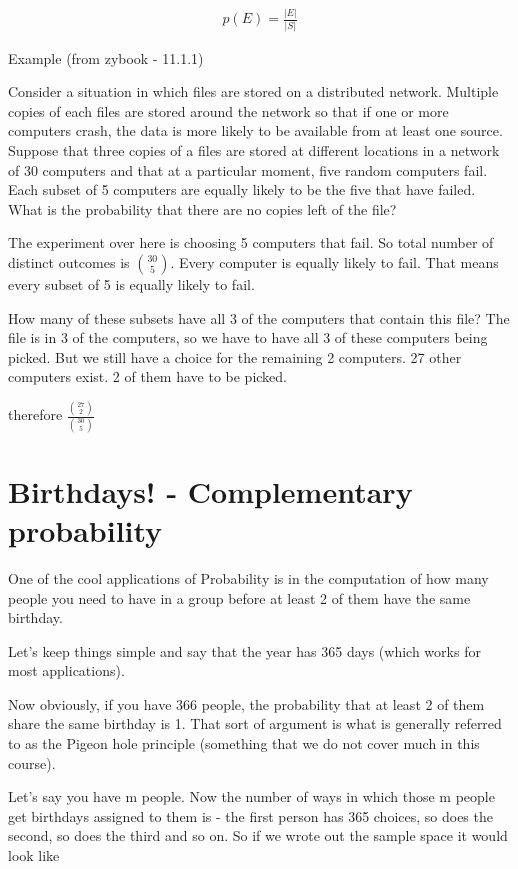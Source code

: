 \documentclass[12pt]{article}
\begin{document}
\begin{align*}
p(E) = \frac{|E|}{|S|}
\end{align*}

\pagebreak

Example (from zybook - 11.1.1)

Consider a situation in which files are stored on a distributed network. Multiple copies of each files are stored around the network so that if one or more computers crash, the data is more likely to be available from at least one source. Suppose that three copies of a files are stored at different locations in a network of 30 computers and that at a particular moment, five random computers fail. Each subset of 5 computers are equally likely to be the five that have failed. What is the probability that there are no copies left of the file?

The experiment over here is choosing 5 computers that fail. So total number of distinct outcomes is ${30 \choose 5}$. Every computer is equally likely to fail. That means every subset of 5 is equally likely to fail. 

How many of these subsets have all 3 of the computers that contain this file? The file is in 3 of the computers, so we have to have all 3 of these computers being picked. But we still have a choice for the remaining 2 computers. 27 other computers exist. 2 of them have to be picked.

therefore $\frac{{27 \choose 2}}{{30 \choose 5}}$

\section*{Birthdays! - Complementary probability}

One of the cool applications of Probability is in the computation of how many people you need to have in a group before at least 2 of them have the same birthday.

Let's keep things simple and say that the year has 365 days (which works for most applications). 

Now obviously, if you have 366 people, the probability that at least 2 of them share the same birthday is 1. That sort of argument is what is generally referred to as the Pigeon hole principle (something that we do not cover much in this course).

Let's say you have m people. Now the number of ways in which those m people get birthdays assigned to them is - the first person has 365 choices, so does the second, so does the third and so on. So if we wrote out the sample space it would look like
\end{document}
